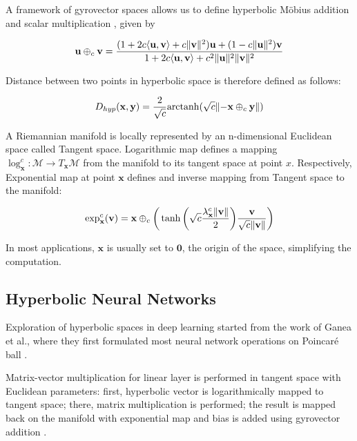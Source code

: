 \documentclass[10pt, letterpaper, twocolumn]{article}
\begin{document}
A framework of gyrovector spaces allows us to define hyperbolic M\"obius addition and scalar multiplication \cite{ungar_analytic_2008,ungar_gyrovector_2009}, given by

\begin{equation}\label{eq:add}
    \mathbf{u} \oplus_c \mathbf{v} = \frac{ (1 + 2c \langle \mathbf{u}, \mathbf{v} \rangle + c \lVert \mathbf{v} \rVert^2) \mathbf{u} + (1 - c \lVert \mathbf{u} \rVert^2) \mathbf{v}} {1 + 2c \langle \mathbf{u}, \mathbf{v} \rangle + c^2 \lVert \mathbf{u} \rVert^2 \lVert \mathbf{v} \rVert^2 }
\end{equation}

Distance between two points in hyperbolic space is therefore defined as follows:

\begin{equation}\label{eq:dist}
    D_{hyp}(\mathbf{x}, \mathbf{y}) = \frac{2}{\sqrt{c}} \mathrm{arctanh}(\sqrt{c} \lVert -\mathbf{x} \oplus_c \mathbf{y} \rVert)
\end{equation}

A Riemannian manifold is locally represented by an n-dimensional Euclidean space called Tangent space. Logarithmic map defines a mapping $\log_\mathbf{x}^c: \mathcal{M} \rightarrow T_\mathbf{x}{\mathcal{M}}$ from the manifold to its tangent space at point $x$. Respectively, Exponential map at point $\mathbf{x}$ defines and inverse mapping from Tangent space to the manifold:

\begin{equation}\label{eq:exp}
    \exp_\mathbf{x}^c(\mathbf{v}) = \mathbf{x} \oplus_c \bigg(\tanh \bigg(\sqrt{c} \frac{\lambda_\mathbf{x}^c \lVert \mathbf{v} \rVert}{2} \bigg) \frac{\mathbf{v}}{\sqrt{c}\lVert \mathbf{v} \rVert}\bigg)
\end{equation}

In most applications, $\mathbf{x}$ is usually set to $\mathbf{0}$, the origin of the space, simplifying the computation.

\subsection{Hyperbolic Neural Networks}

Exploration of hyperbolic spaces in deep learning started from the work of Ganea et al., where they first formulated most neural network operations on Poincar\'e ball \cite{ganea_hyperbolic_2018}.

Matrix-vector multiplication for linear layer is performed in tangent space with Euclidean parameters: first, hyperbolic vector is logarithmically mapped to tangent space; there, matrix multiplication is performed; the result is mapped back on the manifold with exponential map and bias is added using gyrovector addition \cite{ganea_hyperbolic_2018}.
\end{document}
